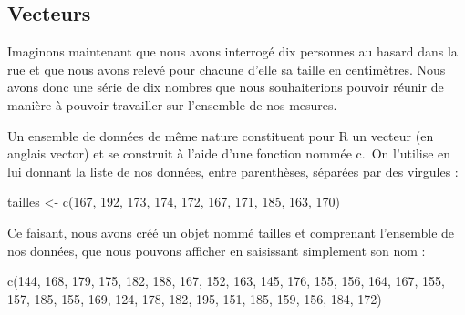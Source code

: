 \documentclass[
]{book}
\newenvironment{Shaded}{\begin{snugshade}}{\end{snugshade}}
\newcommand{\DecValTok}[1]{\textcolor[rgb]{0.00,0.00,0.81}{#1}}
\newcommand{\FunctionTok}[1]{\textcolor[rgb]{0.00,0.00,0.00}{#1}}
\newcommand{\NormalTok}[1]{#1}
\newcommand{\OtherTok}[1]{\textcolor[rgb]{0.56,0.35,0.01}{#1}}
\begin{document}
\hypertarget{vecteurs}{%
\subsection{Vecteurs}\label{vecteurs}}

Imaginons maintenant que nous avons interrogé dix personnes au hasard dans la rue et que nous avons relevé pour chacune d'elle sa taille en centimètres. Nous avons donc une série de dix nombres que nous souhaiterions pouvoir réunir de manière à pouvoir travailler sur l'ensemble de nos mesures.

Un ensemble de données de même nature constituent pour R un vecteur (en anglais vector) et se construit à l'aide d'une fonction nommée c.~On l'utilise en lui donnant la liste de nos données, entre parenthèses, séparées par des virgules :

\begin{Shaded}
\begin{Highlighting}[]
\NormalTok{tailles }\OtherTok{\textless{}{-}} \FunctionTok{c}\NormalTok{(}\DecValTok{167}\NormalTok{, }\DecValTok{192}\NormalTok{, }\DecValTok{173}\NormalTok{, }\DecValTok{174}\NormalTok{, }\DecValTok{172}\NormalTok{, }\DecValTok{167}\NormalTok{, }\DecValTok{171}\NormalTok{, }\DecValTok{185}\NormalTok{, }\DecValTok{163}\NormalTok{, }\DecValTok{170}\NormalTok{)}
\end{Highlighting}
\end{Shaded}

Ce faisant, nous avons créé un objet nommé tailles et comprenant l'ensemble de nos données, que nous pouvons afficher en saisissant simplement son nom :

\begin{Shaded}
\begin{Highlighting}[]
\FunctionTok{c}\NormalTok{(}\DecValTok{144}\NormalTok{, }\DecValTok{168}\NormalTok{, }\DecValTok{179}\NormalTok{, }\DecValTok{175}\NormalTok{, }\DecValTok{182}\NormalTok{, }\DecValTok{188}\NormalTok{, }\DecValTok{167}\NormalTok{, }\DecValTok{152}\NormalTok{, }\DecValTok{163}\NormalTok{, }\DecValTok{145}\NormalTok{, }\DecValTok{176}\NormalTok{, }\DecValTok{155}\NormalTok{, }\DecValTok{156}\NormalTok{, }\DecValTok{164}\NormalTok{, }\DecValTok{167}\NormalTok{, }\DecValTok{155}\NormalTok{, }\DecValTok{157}\NormalTok{, }\DecValTok{185}\NormalTok{, }\DecValTok{155}\NormalTok{, }\DecValTok{169}\NormalTok{, }\DecValTok{124}\NormalTok{, }\DecValTok{178}\NormalTok{, }\DecValTok{182}\NormalTok{, }\DecValTok{195}\NormalTok{, }\DecValTok{151}\NormalTok{, }\DecValTok{185}\NormalTok{, }\DecValTok{159}\NormalTok{, }\DecValTok{156}\NormalTok{, }\DecValTok{184}\NormalTok{, }\DecValTok{172}\NormalTok{)}
\end{Highlighting}
\end{Shaded}
\end{document}
